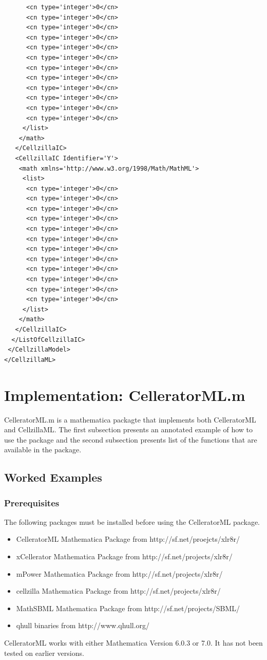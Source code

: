 \documentclass[12pt,letterpaper]{article}
\begin{document}
\begin{verbatim}
      <cn type='integer'>0</cn>
      <cn type='integer'>0</cn>
      <cn type='integer'>0</cn>
      <cn type='integer'>0</cn>
      <cn type='integer'>0</cn>
      <cn type='integer'>0</cn>
      <cn type='integer'>0</cn>
      <cn type='integer'>0</cn>
      <cn type='integer'>0</cn>
      <cn type='integer'>0</cn>
      <cn type='integer'>0</cn>
      <cn type='integer'>0</cn>
     </list>
    </math>
   </CellzillaIC>
   <CellzillaIC Identifier='Y'>
    <math xmlns='http://www.w3.org/1998/Math/MathML'>
     <list>
      <cn type='integer'>0</cn>
      <cn type='integer'>0</cn>
      <cn type='integer'>0</cn>
      <cn type='integer'>0</cn>
      <cn type='integer'>0</cn>
      <cn type='integer'>0</cn>
      <cn type='integer'>0</cn>
      <cn type='integer'>0</cn>
      <cn type='integer'>0</cn>
      <cn type='integer'>0</cn>
      <cn type='integer'>0</cn>
      <cn type='integer'>0</cn>
     </list>
    </math>
   </CellzillaIC>
  </ListOfCellzillaIC>
 </CellzillaModel>
</CellzillaML>
\end{verbatim}

\section{Implementation: CelleratorML.m}\label{section:implementation}




CelleratorML.m is a mathematica packagte that implements both CelleratorML and CellzillaML. The first subsection presents an annotated example of how to use the
package and the second subsection presents list of the functions that are available in the package. 

\subsection{Worked Examples}
\subsubsection{Prerequisites}
The following packages must be installed before using the CelleratorML package.
\begin{itemize}
\item CelleratorML Mathematica Package from http://sf.net/proejcts/xlr8r/
\item xCellerator Mathematica Package from http://sf.net/projects/xlr8r/
\item mPower Mathematica Package from http://sf.net/projects/xlr8r/
\item cellzilla Mathematica Package from http://sf.net/projects/xlr8r/
\item MathSBML Mathematica Package from http://sf.net/projects/SBML/
\item qhull binaries from http://www.qhull.org/
\end{itemize}
CelleratorML works with either Mathematica Version 6.0.3 or 7.0. It has
not been tested on earlier versions. 
\end{document}
